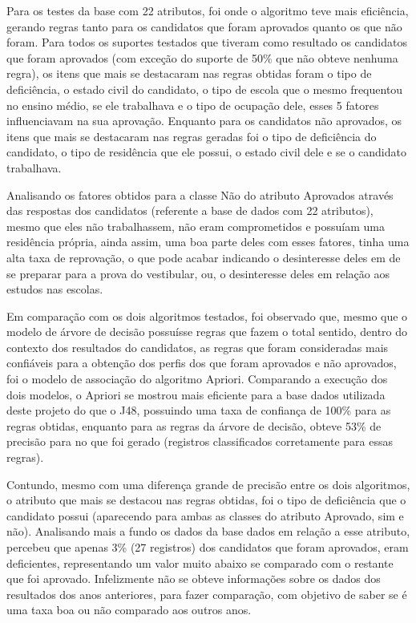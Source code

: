 \par
Para os testes da base com 22 atributos, foi onde o algoritmo teve mais eficiência, gerando regras tanto para os candidatos que foram aprovados quanto os que não foram. Para todos os suportes testados que tiveram como resultado os candidatos que foram aprovados (com exceção do suporte de 50\% que não obteve nenhuma regra), os itens que mais se destacaram nas regras obtidas foram o tipo de deficiência, o estado civil do candidato, o tipo de escola que o mesmo frequentou no ensino médio, se ele trabalhava e o tipo de ocupação dele, esses 5 fatores influenciavam na sua aprovação. Enquanto para os candidatos não aprovados, os itens que mais se destacaram nas regras geradas foi o tipo de deficiência do candidato, o tipo de residência que ele possui, o estado civil dele e se o candidato trabalhava.

\par
Analisando os fatores obtidos para a classe Não do atributo Aprovados através das respostas dos candidatos (referente a base de dados com 22 atributos), mesmo que eles não trabalhassem, não eram comprometidos e possuíam uma residência própria, ainda assim, uma boa parte deles com esses fatores, tinha uma alta taxa de reprovação, o que pode acabar indicando o desinteresse deles em de se preparar para a prova do vestibular, ou, o desinteresse deles em relação aos estudos nas escolas.

\par
Em comparação com os dois algoritmos testados, foi observado que, mesmo que o modelo de árvore de decisão possuísse regras que fazem o total sentido, dentro do contexto dos resultados do candidatos, as regras que foram consideradas mais confiáveis para a obtenção dos perfis dos que foram aprovados e não aprovados, foi o modelo de associação do algoritmo Apriori. Comparando a execução dos dois modelos, o Apriori se mostrou mais eficiente para a base dados utilizada deste projeto do que o J48, possuindo uma taxa de confiança de 100\% para as regras obtidas, enquanto para as regras da árvore de decisão, obteve 53\% de precisão para no que foi gerado (registros classificados corretamente para essas regras).

\par
Contundo, mesmo com uma diferença grande de precisão entre os dois algoritmos, o atributo que mais se destacou nas regras obtidas, foi o tipo de deficiência que o candidato possui (aparecendo para ambas as classes do atributo Aprovado, sim e não). Analisando mais a fundo os dados da base dados em relação a esse atributo, percebeu que apenas 3\% (27 registros) dos candidatos que foram aprovados, eram deficientes, representando um valor muito abaixo se comparado com o restante que foi aprovado. Infelizmente não se obteve informações sobre os dados dos resultados dos anos anteriores, para fazer comparação, com objetivo de saber se é uma taxa boa ou não comparado aos outros anos.


